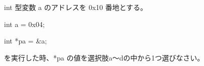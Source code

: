 int 型変数 a のアドレスを 0x10 番地とする。\par
\noindent int a = 0x04; \par
\noindent int *pa = \&a; \par
を実行した時、*pa の値を選択肢a〜dの中から1つ選びなさい。
